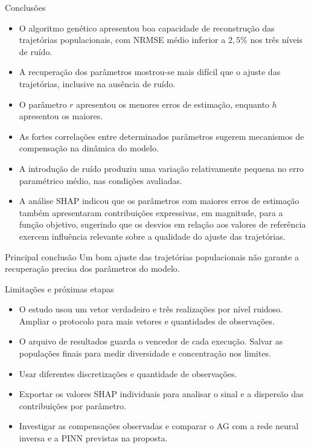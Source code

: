 \begin{frame}{Conclusões}

  \begin{itemize}
    \item O algoritmo genético apresentou boa capacidade de
          reconstrução das trajetórias populacionais, com
          NRMSE médio inferior a $2{,}5\%$ nos três níveis de ruído.

    \item A recuperação dos parâmetros mostrou-se mais difícil
          que o ajuste das trajetórias, inclusive na ausência
          de ruído.

    \item O parâmetro $r$ apresentou os menores erros de estimação,
          enquanto $h$ apresentou os maiores.

    \item As fortes correlações entre determinados parâmetros
          sugerem mecanismos de compensação na dinâmica do modelo.

    \item A introdução de ruído produziu uma variação relativamente
          pequena no erro paramétrico médio, nas condições avaliadas.
    
    \item A análise SHAP indicou que os parâmetros com maiores
      erros de estimação também apresentaram contribuições
      expressivas, em magnitude, para a função objetivo,
      sugerindo que os desvios em relação aos valores de
      referência exercem influência relevante sobre a
      qualidade do ajuste das trajetórias.
  \end{itemize}

  \begin{block}{Principal conclusão}
    Um bom ajuste das trajetórias populacionais não garante
    a recuperação precisa dos parâmetros do modelo.
  \end{block}

\end{frame}

\begin{frame}{Limitações e próximas etapas}
  \begin{itemize}
    \item O estudo usou um vetor verdadeiro e três realizações por nível ruidoso.
          Ampliar o protocolo para mais vetores e quantidades de observações.
    \item O arquivo de resultados guarda o vencedor de cada execução.
          Salvar as populações finais para medir diversidade e concentração nos limites.
    \item Usar diferentes discretizações e quantidade de observações.
    \item Exportar os valores SHAP individuais para analisar o sinal e a
          dispersão das contribuições por parâmetro.
    \item Investigar as compensações observadas e comparar o AG com a
          rede neural inversa e a PINN previstas na proposta.
  \end{itemize}
\end{frame}
